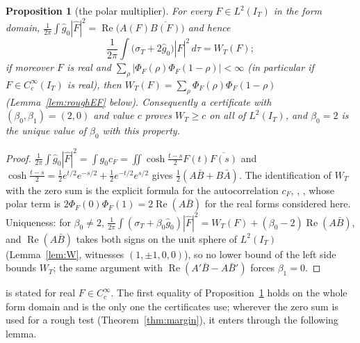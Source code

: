 \documentclass[11pt]{amsart}
\newtheorem{proposition}[theorem]{Proposition}
\theoremstyle{definition}
\theoremstyle{remark}
\newcommand{\Rel}{\operatorname{Re}}
\newcommand{\IT}{I_T}
\newcommand{\sT}{\sigma_T}
\newcommand{\gh}[1]{\widehat g_{#1}}
\newcommand{\Fh}{\widehat F}
\newcommand{\cF}{c_F}
\begin{document}
\begin{proposition}[the polar multiplier]\label{prop:P}
For every $F\in L^2(\IT)$ in the form domain,
$\frac1{2\pi}\int\gh0|\Fh|^2=\Rel\big(A(F)\overline{B(F)}\big)$ and hence
\[
\frac1{2\pi}\int\big(\sT+2\gh0\big)|\Fh|^2\,d\tau=W_T(F);
\]
if moreover $F$ is real and $\sum_\rho|\Phi_F(\rho)\Phi_F(1-\rho)|<\infty$ (in particular if
$F\in C_c^\infty(\IT)$ is real), then $W_T(F)=\sum_\rho\Phi_F(\rho)\Phi_F(1-\rho)$
(Lemma~\ref{lem:roughEF} below).
Consequently a certificate with $(\beta_0,\beta_1)=(2,0)$ and value $c$ proves $W_T\ge c$ on all
of $L^2(\IT)$, and $\beta_0=2$ is the unique value of $\beta_0$ with this property.
\end{proposition}
\begin{proof}
$\frac1{2\pi}\int\gh0|\Fh|^2=\int g_0\cF=\iint\cosh\frac{t-s}2F(t)\overline{F(s)}$ and
$\cosh\frac{t-s}2=\frac12e^{t/2}e^{-s/2}+\frac12e^{-t/2}e^{s/2}$ gives $\frac12(A\bar B+B\bar A)$.
The identification of $W_T$ with the zero sum is the explicit formula for the autocorrelation
$\cF$, \cite{Weil52,Bombieri2000}, \cite[Thm.~8.4]{Paper45}, whose polar term is
$2\Phi_F(0)\Phi_F(1)=2\Rel(A\bar B)$ for the real forms considered here. Uniqueness: for
$\beta_0\ne2$, $\frac1{2\pi}\int(\sT+\beta_0\gh0)|\Fh|^2=W_T(F)+(\beta_0-2)\Rel(A\bar B)$, and
$\Rel(A\bar B)$ takes both signs on the unit sphere of $L^2(\IT)$ (Lemma~\ref{lem:W}, witnesses
$(1,\pm1,0,0)$), so no lower bound of the left side bounds $W_T$; the same argument with
$\Rel(A'\bar B-A\bar B')$ forces $\beta_1=0$.
\end{proof}

\cite[Thm.~8.4]{Paper45} is stated for real $F\in C_c^\infty$. The first equality of
Proposition~\ref{prop:P} holds on the whole form domain and is the only one the certificates use;
wherever the zero sum is used for a rough test (Theorem~\ref{thm:margin}), it enters through the
following lemma.
\end{document}
